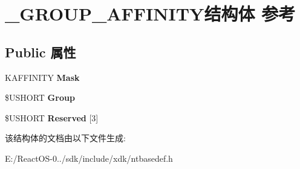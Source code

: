 \hypertarget{struct___g_r_o_u_p___a_f_f_i_n_i_t_y}{}\section{\+\_\+\+G\+R\+O\+U\+P\+\_\+\+A\+F\+F\+I\+N\+I\+T\+Y结构体 参考}
\label{struct___g_r_o_u_p___a_f_f_i_n_i_t_y}
\subsection*{Public 属性}
\begin{DoxyCompactItemize}
\item 
\mbox{\label{struct___g_r_o_u_p___a_f_f_i_n_i_t_y_ae688fc66ad26aeb1d49bab09fdecbafb}} 
K\+A\+F\+F\+I\+N\+I\+TY {\bfseries Mask}
\item 
\mbox{\label{struct___g_r_o_u_p___a_f_f_i_n_i_t_y_a66d3305681e56c08cdf187ee15b633cf}} 
\$U\+S\+H\+O\+RT {\bfseries Group}
\item 
\mbox{\label{struct___g_r_o_u_p___a_f_f_i_n_i_t_y_a1b30117b8e86400d3910d26ad740f9a5}} 
\$U\+S\+H\+O\+RT {\bfseries Reserved} \mbox{[}3\mbox{]}
\end{DoxyCompactItemize}


该结构体的文档由以下文件生成\+:\begin{DoxyCompactItemize}
\item 
E\+:/\+React\+O\+S-\/0../sdk/include/xdk/ntbasedef.\+h\end{DoxyCompactItemize}
